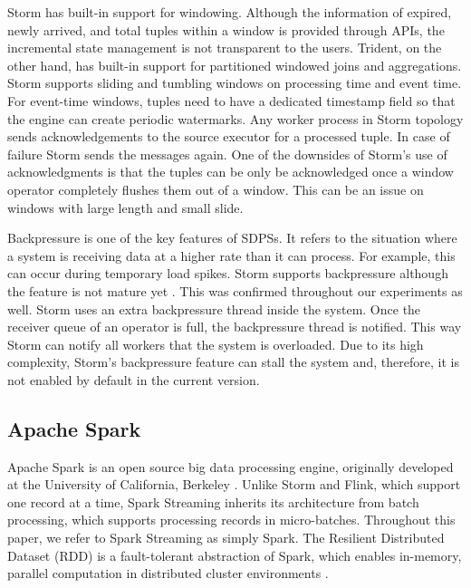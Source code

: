 Storm has built-in support for windowing.  Although the information of expired, newly arrived, and total tuples within a window is provided through APIs, the incremental state management is not transparent to the users. Trident, on the other hand,  has built-in support for partitioned windowed joins and aggregations. Storm supports sliding and tumbling windows on processing time and event time. For event-time windows, tuples need to have a dedicated timestamp field so that the engine can create periodic watermarks.  Any worker process in Storm topology sends acknowledgements to the source executor for a processed tuple. In case of failure Storm sends the messages again. One of the downsides of Storm's use of acknowledgments is that the tuples can be only be acknowledged once a window operator  completely flushes them out of a window. This can be an issue on windows with large length and small slide.%

Backpressure is one of the key features of SDPSs. It refers to the situation where a system is receiving data at a higher rate than it can process. For example, this can occur during temporary load spikes. Storm supports backpressure although the feature is not mature yet \cite{WinNT}. This was confirmed throughout our experiments as well. %
Storm uses an extra backpressure thread inside the system. Once the receiver queue of an operator is full, the backpressure thread is notified. %
This way Storm can notify all workers that the system is overloaded. Due to its high complexity, Storm's backpressure feature can stall the system and, therefore, it is not enabled by default in the current version.


\subsection{Apache Spark}
Apache Spark is an open source big data processing engine, originally developed at the University of California, Berkeley \cite{spark}. %
Unlike Storm and Flink, which support one record at a time, Spark Streaming inherits its architecture from batch processing, which supports processing records in micro-batches. Throughout this paper, we refer to Spark Streaming as simply Spark. The Resilient Distributed Dataset (RDD) is a fault-tolerant abstraction of Spark, which enables in-memory, parallel computation in  distributed cluster environments \cite{zaharia2012resilient}.  


